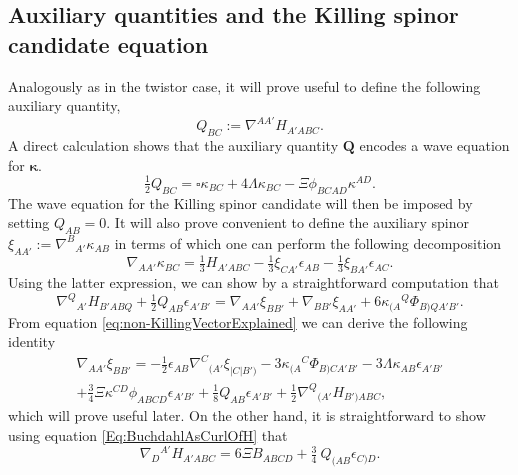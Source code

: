 \documentclass[10pt,a4paper]{article}
\theoremstyle{plain}
\def\bmQ{{\bm Q}}
\newcounter{mnotecount}%
\newcommand{\mnotex}[1]%
{\protect{\stepcounter{mnotecount}}$^{\mbox{\footnotesize $\bullet$\themnotecount}}$ 
\marginpar{%
\raggedright\tiny\em
$\!\!\!\!\!\!\,\bullet$\themnotecount: #1} }
\begin{document}
\subsection{Auxiliary quantities and the Killing spinor candidate equation}
Analogously as in the twistor case, it will prove useful to define the
following auxiliary quantity,
\begin{equation}
  Q_{BC} := \nabla^{AA'}H_{A'ABC}.
  \label{Eq:WaveForKS_DefinitionQ}
\end{equation}
A direct calculation shows that the auxiliary quantity $\bmQ$ encodes
a wave equation for $\bm\kappa$.
\begin{equation}
  \tfrac{1}{2}Q_{BC} = \square \kappa_{BC} + 4 \Lambda\kappa_{BC} - \Xi
  \phi_{BCAD}\kappa^{AD}. %
  \label{Eq:WaveForKS}
\end{equation}
\noindent The wave equation for the Killing spinor candidate will then
be imposed by setting $Q_{AB}=0$. It will also prove convenient to
define the auxiliary spinor $\xi_{AA'} :=
\nabla^{B}{}_{A'}\kappa_{AB}$ in terms of which one can perform the
following decomposition 
\begin{equation}
\nabla_{AA'}\kappa_{BC} = \tfrac{1}{3} H_{A'ABC} - \tfrac{1}{3}
\xi_{CA'} \epsilon_{AB} - \tfrac{1}{3} \xi_{BA'}
\epsilon_{AC}.\label{Eq:DecompGradKS}
\end{equation}
Using the latter expression, we can show by a straightforward
computation that
\begin{equation}\label{eq:non-KillingVectorExplained}
  \nabla^Q{}_{A'}H_{B'ABQ} + \tfrac{1}{2} Q_{AB} \epsilon_{A'B'} = \nabla_{AA'}\xi_{BB'} + \nabla_{BB'}\xi_{AA'} + 6 \kappa_{(A}{}^{Q} \Phi_{B)QA'B'} .
\end{equation}
\noindent 
From equation \eqref{eq:non-KillingVectorExplained}
we can derive the following identity
\begin{multline}
\nabla_{AA'}\xi_{BB'} = - \tfrac{1}{2} \epsilon_{AB}
\nabla^{C}{}_{(A'}\xi_{|C|B')}- 3 \kappa_{(A}{}^{C} \Phi_{B)CA'B'} - 3
\Lambda \kappa_{AB} \epsilon_{A'B'} \\+ \tfrac{3}{4} \Xi \kappa^{CD}
\phi_{ABCD} \epsilon_{A'B'} + \tfrac{1}{8} Q_{AB} \epsilon_{A'B'} +
\tfrac{1}{2} \nabla^Q{}_{(A'}H_{B')ABC},\label{Eq:DecompGradXi}
\end{multline}
which will prove useful later. On the other hand, it is
straightforward to show using equation \eqref{Eq:BuchdahlAsCurlOfH} that
\begin{equation}
     \nabla_{D}{}^{A'}H_{A'ABC} = 6 \Xi B_{ABCD} + \tfrac{3}{4}
     \ Q_{(AB}\epsilon_{C)D}.\label{IrrDecompCurlOfH}
\end{equation}
\end{document}

